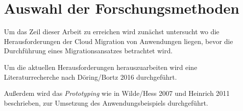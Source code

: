 \section{Auswahl der Forschungsmethoden}
\label{sec:auswahl_forschungsmethoden}

Um das Zeil dieser Arbeit zu erreichen wird zunächst untersucht wo die Herausforderungen der Cloud Migration
von Anwendungen liegen, bevor die Durchführung eines Migrationsansatzes betrachtet wird.

Um die aktuellen Herausforderungen herauszuarbeiten wird eine Literaturrecherche nach Döring/Bortz 2016
durchgeführt.

Außerdem wird das \textit{Prototyping} wie in Wilde/Hess 2007 und Heinrich 2011 beschrieben,
zur Umsetzung des Anwendungsbeispiels durchgeführt.